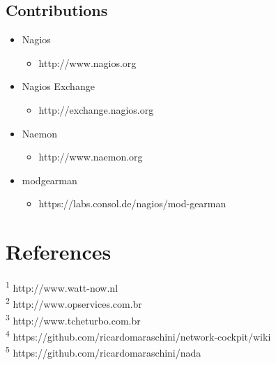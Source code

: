 \documentclass{article}
\begin{document}
\begin{multicols}{2}
\subsection{Contributions}
\begin{itemize}
	\item Nagios
		\begin{itemize}
			\item http://www.nagios.org
		\end{itemize}
	\item Nagios Exchange
		\begin{itemize}
			\item http://exchange.nagios.org
		\end{itemize}
	\item Naemon
		\begin{itemize}
			\item http://www.naemon.org
		\end{itemize}
	\item modgearman
		\begin{itemize}
			\item https://labs.consol.de/nagios/mod-gearman
		\end{itemize}
\end{itemize}

\section{References}

\tiny \textsuperscript{1} http://www.watt-now.nl\\
\tiny \textsuperscript{2} http://www.opservices.com.br\\
\tiny \textsuperscript{3} http://www.tcheturbo.com.br\\
\tiny \textsuperscript{4} https://github.com/ricardomaraschini/network-cockpit/wiki\\
\tiny \textsuperscript{5} https://github.com/ricardomaraschini/nada

\end{multicols}
\end{document}
